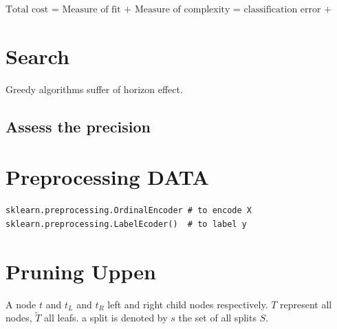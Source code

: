 \documentclass[10pt,a4paper]{article}
\begin{document}
$\mbox{Total cost = Measure of fit + Measure of complexity = classification error + number of leaf}$




















\section{Search}

Greedy algorithms suffer of horizon effect.









\subsection{Assess the precision }














\section{Preprocessing DATA}

\begin{lstlisting}
sklearn.preprocessing.OrdinalEncoder # to encode X
sklearn.preprocessing.LabelEcoder()  # to label y
\end{lstlisting}





\section{Pruning Uppen}
A node $t$ and $t_{L}$ and $t_{R}$ left and right child nodes respectively.
$T$ represent all nodes, $\tilde{T}$ all leafs.
a split is denoted by $s$ the set of all splits $S$.
\end{document}
